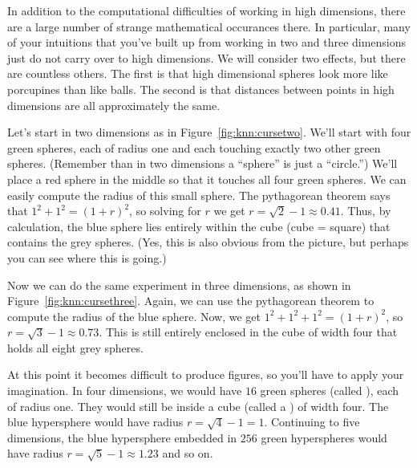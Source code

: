 
In addition to the computational difficulties of working in high
dimensions, there are a large number of strange mathematical
occurances there.  In particular, many of your intuitions that you've
built up from working in two and three dimensions just do not carry
over to high dimensions.  We will consider two effects, but there are
countless others.  The first is that high dimensional spheres look
more like porcupines than like balls.
The second is that distances between points in high dimensions are all
approximately the same.


Let's start in two dimensions as in Figure~\ref{fig:knn:cursetwo}.
We'll start with four green spheres, each of radius one and each
touching exactly two other green spheres.  (Remember than in two
dimensions a ``sphere'' is just a ``circle.'')  We'll place a red
sphere in the middle so that it touches all four green spheres.  We
can easily compute the radius of this small sphere.  The pythagorean
theorem says that $1^2 + 1^2 = (1+r)^2$, so solving for $r$ we get $r
= \sqrt 2 - 1 \approx 0.41$.  Thus, by calculation, the blue sphere
lies entirely within the cube (cube = square) that contains the grey
spheres.  (Yes, this is also obvious from the picture, but perhaps you
can see where this is going.)


Now we can do the same experiment in three dimensions, as shown in
Figure~\ref{fig:knn:cursethree}.  Again, we can use the pythagorean
theorem to compute the radius of the blue sphere.  Now, we get $1^2 +
1^2 + 1^2 = (1+r)^2$, so $r = \sqrt3 - 1 \approx 0.73$.  This is still
entirely enclosed in the cube of width four that holds all eight grey
spheres.

At this point it becomes difficult to produce figures, so you'll have
to apply your imagination.  In four dimensions, we would have $16$
green spheres (called ), each of radius one.
They would still be inside a cube (called a ) of
width four.  The blue hypersphere would have radius $r = \sqrt4 - 1 =
1$.  Continuing to five dimensions, the blue hypersphere embedded in
$256$ green hyperspheres would have radius $r = \sqrt5-1 \approx 1.23$
and so on.

